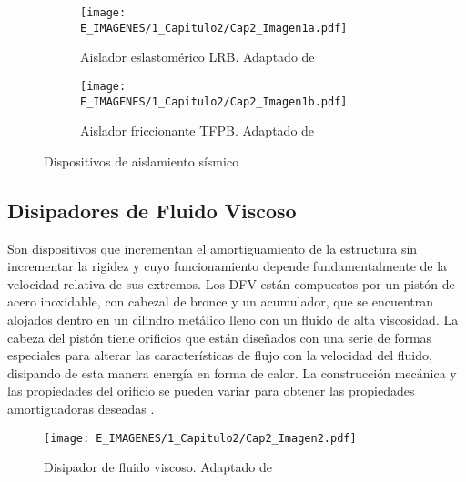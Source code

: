 	\begin{figure}[!h]
	\centering
	\begin{subfigure}[b]{0.45\textwidth}
  	\centering
  	\texttt{[image: E\_IMAGENES/1\_Capitulo2/Cap2\_Imagen1a.pdf]}
	\caption{\centering\footnotesize Aislador eslastomérico LRB. Adaptado de \citet{Bridgestone2015}}
  	\label{Cap2_Figura1a}
	\end{subfigure}
	\hfill
	\begin{subfigure}[b]{0.45\textwidth}
  	\centering
  	\texttt{[image: E\_IMAGENES/1\_Capitulo2/Cap2\_Imagen1b.pdf]} 
  	\caption{\centering\footnotesize Aislador friccionante TFPB. Adaptado de \citet{Fenz2008}}
  	\label{Cap2_Figura1b}
	\end{subfigure}
	\caption[Dispositivos de aislamiento sísmico]{\centering\footnotesize Dispositivos de aislamiento sísmico}
	\label{Cap2_Figura1}
	\end{figure}
	
	\subsection{Disipadores de Fluido Viscoso}
Son dispositivos que incrementan el amortiguamiento de la estructura sin incrementar la rigidez y cuyo funcionamiento depende fundamentalmente de la velocidad relativa de sus extremos. Los DFV están compuestos por un pistón de acero inoxidable, con cabezal de bronce y un acumulador, que se encuentran alojados dentro en un cilindro metálico lleno con un fluido de alta viscosidad. La cabeza del pistón tiene orificios que están diseñados con una serie de formas especiales para alterar las características de flujo con la velocidad del fluido, disipando de esta manera energía en forma de calor. La construcción mecánica y las propiedades del orificio se pueden variar para obtener las propiedades amortiguadoras deseadas \citep{Constantinou1993}.

	\begin{figure}[!h]
	\centering
		\texttt{[image: E\_IMAGENES/1\_Capitulo2/Cap2\_Imagen2.pdf]}
	\caption[Disipador de fluido viscoso]{\centering\footnotesize Disipador de fluido viscoso.  Adaptado de \citet{Taylor2019}}
	\label{Cap2_Figura2}
	\end{figure}
	
	
	
	
